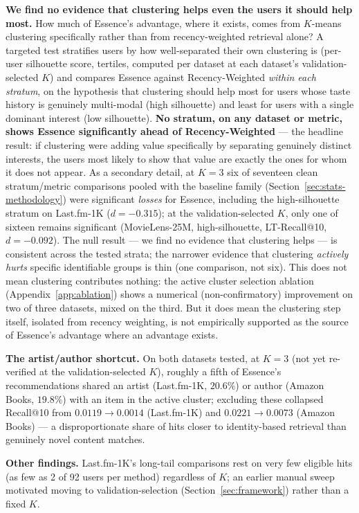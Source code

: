 \documentclass{article}
\begin{document}
\textbf{We find no evidence that clustering helps even the users it should help most.} How much of Essence's advantage, where it exists, comes from $K$-means clustering specifically rather than from recency-weighted retrieval alone? A targeted test stratifies users by how well-separated their own clustering is (per-user silhouette score, tertiles, computed per dataset at each dataset's validation-selected $K$) and compares Essence against Recency-Weighted \emph{within each stratum}, on the hypothesis that clustering should help most for users whose taste history is genuinely multi-modal (high silhouette) and least for users with a single dominant interest (low silhouette). \textbf{No stratum, on any dataset or metric, shows Essence significantly ahead of Recency-Weighted} --- the headline result: if clustering were adding value specifically by separating genuinely distinct interests, the users most likely to show that value are exactly the ones for whom it does not appear. As a secondary detail, at $K=3$ six of seventeen clean stratum/metric comparisons pooled with the baseline family (Section~\ref{sec:stats-methodology}) were significant \emph{losses} for Essence, including the high-silhouette stratum on Last.fm-1K ($d=-0.315$); at the validation-selected $K$, only one of sixteen remains significant (MovieLens-25M, high-silhouette, LT-Recall@10, $d=-0.092$). The null result --- we find no evidence that clustering helps --- is consistent across the tested strata; the narrower evidence that clustering \emph{actively hurts} specific identifiable groups is thin (one comparison, not six). This does not mean clustering contributes nothing: the active cluster selection ablation (Appendix~\ref{app:ablation}) shows a numerical (non-confirmatory) improvement on two of three datasets, mixed on the third. But it does mean the clustering step itself, isolated from recency weighting, is not empirically supported as the source of Essence's advantage where an advantage exists.

\textbf{The artist/author shortcut.} On both datasets tested, at $K=3$ (not yet re-verified at the validation-selected $K$), roughly a fifth of Essence's recommendations shared an artist (Last.fm-1K, $20.6\%$) or author (Amazon Books, $19.8\%$) with an item in the active cluster; excluding these collapsed Recall@10 from $0.0119\to0.0014$ (Last.fm-1K) and $0.0221\to0.0073$ (Amazon Books) --- a disproportionate share of hits closer to identity-based retrieval than genuinely novel content matches.

\textbf{Other findings.} Last.fm-1K's long-tail comparisons rest on very few eligible hits (as few as 2 of 92 users per method) regardless of $K$; an earlier manual sweep motivated moving to validation-selection (Section~\ref{sec:framework}) rather than a fixed $K$.
\end{document}
